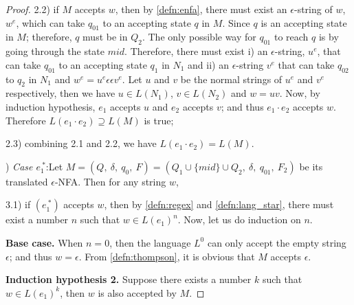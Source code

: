 \begin{proof}
\par 2.2) if \(M\) accepts \(w\), then by \autoref{defn:enfa}, there must
exist an \(\epsilon\)-string of \(w\), \(w^e\), which can take
\(q_{01}\) to an accepting state \(q\) in \(M\). Since \(q\) is an
accepting state in \(M\); therefore, \(q\) must be in \(Q_2\). The only possible way for
\(q_{01}\) to reach \(q\) is by going through the state \(mid\). Therefore, there must exist i) an \(\epsilon\)-string, \(u^e\), that can take
\(q_{01}\) to an accepting state \(q_1\) in \(N_1\) and ii) an
\(\epsilon\)-string \(v^e\) that can take \(q_{02}\) to \(q_2\) in
\(N_1\) and \(w^e = u^e\epsilon\epsilon v^e\). Let \(u\) and \(v\) be the normal strings of \(u^e\) and
\(v^e\) respectively, then we have \(u \in L(N_1)\), \(v \in L(N_2)\) and \(w = uv\). Now, by induction
hypothesis, \(e_1\) accepts \(u\) and \(e_2\) accepts \(v\); and thus
\(e_1 \cdot e_2\) accepts \(w\). Therefore \(L(e_1 \cdot e_2) \supseteq L(M)\) is true; 

\par 2.3) combining 2.1 and 2.2, we have \(L(e_1 \cdot e_2) = L(M)\). 

\par {}) \textit{Case \(e_1^{\ *}\)}:\quad Let \(M = (Q,\ \delta,\ q_0,\
F) = (Q_1 \cup \{mid\} \cup Q_2,\ \delta,\ q_{01},\ F_2)\) be its
translated \(\epsilon\)-NFA. Then for any string \(w\), 

\par 3.1) if \((e_1^{\ *})\) accepts \(w\), then by \autoref{defn:regex}
and \autoref{defn:lang_star}, there must exist a number \(n\) such
that \(w \in L(e_1)^n\). Now, let us do induction on \(n\). 

\par \quad \textbf{Base case.} \quad When \(n = 0\), then the language
\(L^0\) can only accept the empty string \(\epsilon\); and thus \(w =
\epsilon\). From \autoref{defn:thompson}, it is obvious that \(M\)
accepts \(\epsilon\). 

\par \quad \textbf{Induction hypothesis 2.} \quad Suppose there exists a number \(k\) such that \(w
\in L(e_1)^k\), then \(w\) is also accepted by \(M\). 


\end{proof}
